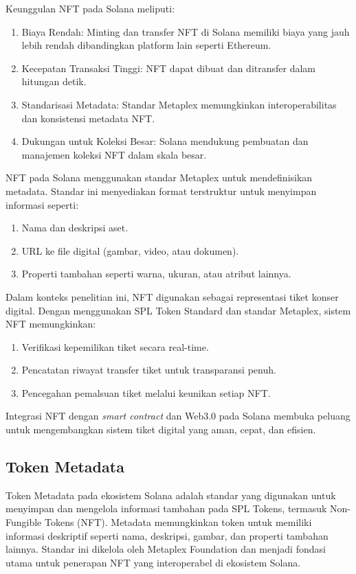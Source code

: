 Keunggulan NFT pada Solana meliputi:
\begin{enumerate}
    \item Biaya Rendah: Minting dan transfer NFT di Solana memiliki biaya yang jauh lebih rendah dibandingkan platform lain seperti Ethereum.
    \item Kecepatan Transaksi Tinggi: NFT dapat dibuat dan ditransfer dalam hitungan detik.
    \item Standarisasi Metadata: Standar Metaplex memungkinkan interoperabilitas dan konsistensi metadata NFT.
    \item Dukungan untuk Koleksi Besar: Solana mendukung pembuatan dan manajemen koleksi NFT dalam skala besar.
\end{enumerate}

NFT pada Solana menggunakan standar Metaplex untuk mendefinisikan metadata. Standar ini menyediakan format terstruktur untuk menyimpan informasi seperti:
\begin{enumerate}
    \item Nama dan deskripsi aset.
    \item URL ke file digital (gambar, video, atau dokumen).
    \item Properti tambahan seperti warna, ukuran, atau atribut lainnya.
\end{enumerate}



Dalam konteks penelitian ini, NFT digunakan sebagai representasi tiket konser digital. Dengan menggunakan SPL Token Standard dan standar Metaplex, sistem NFT memungkinkan:
\begin{enumerate}
    \item Verifikasi kepemilikan tiket secara real-time.
    \item Pencatatan riwayat transfer tiket untuk transparansi penuh.
    \item Pencegahan pemalsuan tiket melalui keunikan setiap NFT.
\end{enumerate}

Integrasi NFT dengan \textit{smart contract} dan Web3.0 pada Solana membuka peluang untuk mengembangkan sistem tiket digital yang aman, cepat, dan efisien.


\subsection{Token Metadata}

Token Metadata pada ekosistem Solana adalah standar yang digunakan untuk menyimpan dan mengelola informasi tambahan pada SPL Tokens, termasuk Non-Fungible Tokens (NFT). Metadata memungkinkan token untuk memiliki informasi deskriptif seperti nama, deskripsi, gambar, dan properti tambahan lainnya. Standar ini dikelola oleh Metaplex Foundation dan menjadi fondasi utama untuk penerapan NFT yang interoperabel di ekosistem Solana.\\

